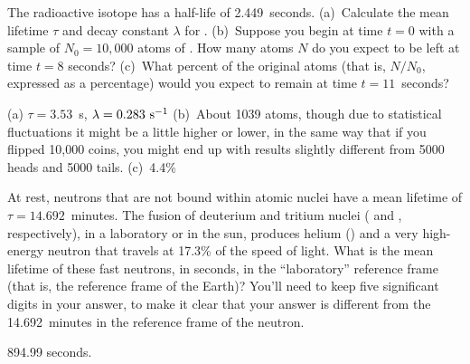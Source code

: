 \begin{Exercise}
The radioactive isotope  has a half-life of 2.449~seconds.  (a)~Calculate the mean lifetime $\tau$ and decay constant $\lambda$ for .  (b)~Suppose you begin at time $t=0$ with a sample of $N_0=10,000$ atoms of .  How many atoms $N$ do you expect to be left at time $t=8$ seconds?  (c)~What percent of the original atoms (that is, $N/N_0$, expressed as a percentage) would you expect to remain at time $t=11$~seconds?
\end{Exercise}
\begin{Answer}
(a) $\tau=3.53$~s, $\lambda=0.283~{\rm s}^{-1}$  (b)~About 1039 atoms, though due to statistical fluctuations it might be a little higher or lower, in the same way that if you flipped 10,000 coins, you might end up with results slightly different from 5000 heads and 5000 tails.  (c)~4.4\%
\end{Answer}


\begin{Exercise}
At rest, neutrons that are not bound within atomic nuclei have a mean lifetime of $\tau=14.692$~minutes.  The fusion of deuterium and tritium nuclei ( and , respectively), in a laboratory or in the sun, produces helium () and a very high-energy neutron that travels at 17.3\% of the speed of light.  What is the mean lifetime of these fast neutrons, in seconds, in the ``laboratory'' reference frame (that is, the reference frame of the Earth)?  You'll need to keep five significant digits in your answer, to make it clear that your answer is different from the 
14.692~minutes in the reference frame of the neutron.
\end{Exercise}
\begin{Answer}
894.99 seconds.
\end{Answer}

